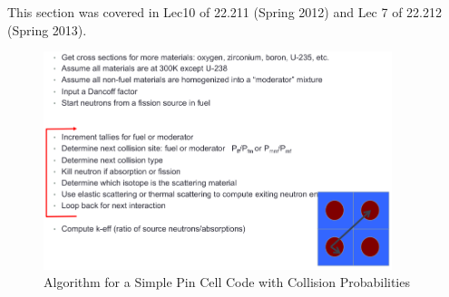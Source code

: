 \documentclass{school-22.211-notes}
\begin{document}
\clearpage
{}
This section was covered in Lec10 of 22.211 (Spring 2012) and Lec 7 of 22.212 (Spring 2013). 
\begin{figure}[h]
  \centering
  \includegraphics[width=4in]{images/r-m/pin-cell-code.png}
  \caption{Algorithm for a Simple Pin Cell Code with Collision Probabilities}
\end{figure}
\end{document}
